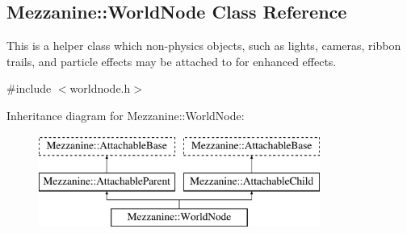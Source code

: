 \hypertarget{classMezzanine_1_1WorldNode}{
\subsection{Mezzanine::WorldNode Class Reference}
\label{classMezzanine_1_1WorldNode}
}


This is a helper class which non-\/physics objects, such as lights, cameras, ribbon trails, and particle effects may be attached to for enhanced effects.  




{\ttfamily \#include $<$worldnode.h$>$}

Inheritance diagram for Mezzanine::WorldNode:\begin{figure}[H]
\begin{center}
\leavevmode
\includegraphics[height=3.000000cm]{classMezzanine_1_1WorldNode}
\end{center}
\end{figure}

